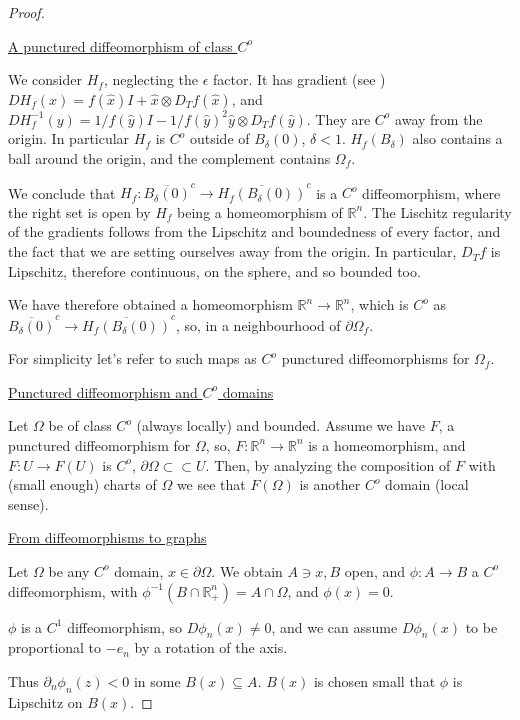 \documentclass[english,a4paper,10pt,oneside]{scrbook}	%
\theoremstyle{break}
\newenvironment{mproof}[1][\proofname]{%
  \begin{proof}[#1]$ $\par\nobreak\ignorespaces
}{%
  \end{proof}
}
\renewcommand*{\proofname}{Proof}
\theoremstyle{remark}
\newcommand{\mR}{\mathbb{R}}
\newcommand{\cc}{\subset\subset}
\newcommand{\xh}{\hat{x}}
\newcommand{\yh}{\hat{y}}
\newcommand{\eps}{\epsilon}
\begin{document}
\begin{mproof}

\underline{A punctured diffeomorphism of class $C^o$}

We consider $H_f$, neglecting the $\eps$ factor. It has gradient (see \cite{deckelnick}) $D H_f(x) = f(\xh)I+\xh \otimes D_Tf(\xh)$, and  $D H_f^{-1}(y) =1/f(\yh)I-1/f(\yh)^2 \yh \otimes D_Tf(\yh)$. They are $C^o$ away from the origin. In particular $H_f$ is $C^o$  outside of $B_\delta(0)$, $\delta < 1$. $H_f(B_\delta)$ also contains a ball around the origin, and the complement contains $\Omega_f$.

We conclude that $H_f: \overline{B_\delta(0)}^c \rightarrow \overline{H_f(B_\delta(0))}^c$ is a $C^o$ diffeomorphism, where the right set is open by $H_f$ being a homeomorphism of $\mR^n$. The Lischitz regularity of the gradients follows from the Lipschitz and boundedness of every factor, and the fact that we are setting ourselves away from the origin. In particular, $D_T f$ is Lipschitz, therefore continuous, on the sphere, and so bounded too.

We have therefore obtained a homeomorphism $\mR^n \rightarrow \mR^n$, which is $C^o$ as $\overline{B_\delta(0)}^c \rightarrow \overline{H_f(B_\delta(0))}^c$, so, in a neighbourhood of $\partial \Omega_f$.

For simplicity let's refer to such maps as $C^o$ punctured diffeomorphisms for $\Omega_f$.

\underline{Punctured diffeomorphism and $C^o$ domains}

Let $\Omega$ be of class $C^o$ (always locally) and bounded. Assume we have $F$, a punctured diffeomorphism for $\Omega$, so, $F:\mR^n\rightarrow \mR^n$ is a homeomorphism, and $F: U\rightarrow F(U)$ is $C^o$, $\partial \Omega \cc U$. Then, by analyzing the composition of $F$ with (small enough) charts of $\Omega$ we see that $F(\Omega)$ is another $C^o$ domain (local sense). 

\underline{From diffeomorphisms to graphs}

Let $\Omega$ be any $C^o$ domain, $x\in \partial \Omega$. We obtain $A\ni x, B$ open, and $\phi: A\rightarrow B$ a $C^o$ diffeomorphism, with $\phi^{-1}(B\cap \mR^n_+)=A\cap \Omega$, and $\phi(x)=0$.

$\phi$ is a $C^1$ diffeomorphism, so $D\phi_n(x)\neq 0$, and we can assume $D\phi_n(x)$ to be proportional to $-e_n$ by a rotation of the axis.

Thus $\partial_n\phi_n(z)<0$ in some $B(x)\subseteq A$. $B(x)$ is chosen small that $\phi$ is Lipschitz on $B(x)$.


\end{mproof}
\end{document}
